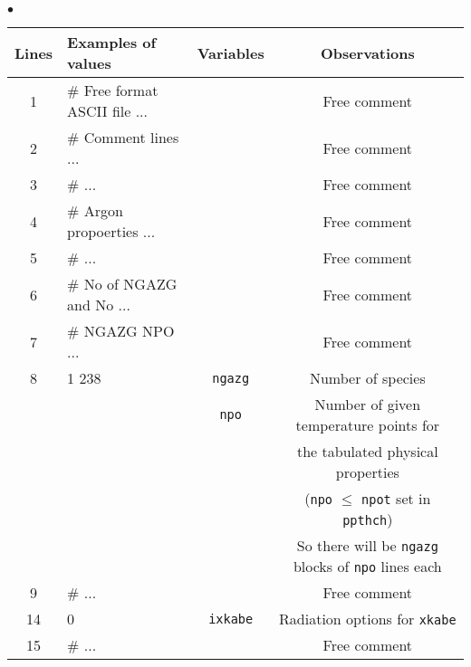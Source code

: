 {{{\begin{list}{$\bullet$}{}
\begin{table}[htbp]
\begin{center}
\small{
\begin{tabular}{|c|l|c|c|} \hline
 Lines  &        Examples of values        & Variables & Observations                                       \\ \hline
  1     &\# Free format ASCII file ...     &           & Free comment                                       \\ \hline
  2     &\# Comment lines ...              &           & Free comment                                       \\ \hline
  3     &\#                            ... &           & Free comment                                       \\ \hline
  4     &\# Argon propoerties ...          &           & Free comment                                       \\ \hline
  5     &\#                            ... &           & Free comment                                       \\ \hline
  6     &\# No of NGAZG and No   ... &           & Free comment                                       \\ \hline
  7     &\# NGAZG NPO                  ... &           & Free comment                                       \\ \hline
  8     &    1   238         &    \texttt{ngazg\index{ngazg}}   & Number of species                         \\
        &                    &    \texttt{npo\index{npo}}       & Number of given temperature points for    \\
        &                    &                         & the tabulated physical properties                  \\
        &                    &                         & (\texttt{npo} $\leqslant$ \texttt{npot} set in \texttt{ppthch})             \\
        &                    &                         & So there will be \texttt{ngazg} blocks of \texttt{npo} lines each    \\ \hline
  9     &\#                            ... &           & Free comment                                       \\ \hline
 14     &        0           & \texttt{ixkabe\index{ixkabe}} & Radiation options for \texttt{xkabe\index{xkabe}}   \\ \hline
 15     &\#                            ... &           & Free comment                                       \\ \hline

\end{tabular}}
\end{center}
\end{table}
\end{list}}}}

